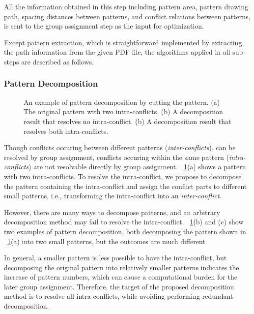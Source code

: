 All the information obtained in this step including pattern area,
pattern drawing path, spacing distances between patterns,
and conflict relations between patterns,
is sent to the group assignment step as the input for optimization.

Except pattern extraction,
which is straightforward implemented by extracting the path information from the given PDF file,
the algorithms applied in all sub-steps are described as follows.

\subsubsection{Pattern Decomposition}\label{sec:pd}

\begin{figure}[t]
	\fontsize{14}{14}  \selectfont
	\centerline{\resizebox{8.5cm}{!}{}}
	\caption{An example of pattern decomposition by cutting the pattern. (a) The original pattern with two intra-conflicts. (b) A decomposition result that resolves no intra-conflict. (b) A decomposition result that resolves both intra-conflicts.}
	\label{fig:selfcon}
	\normalsize
\end{figure}

Though conflicts occuring between different patterns (\textit{inter-conflicts}),
can be resolved by group assignment,
conflicts occuring within the same pattern (\textit{intra-conflicts})
are not resolvable directly by group assignment.
\figurename~\ref{fig:selfcon}(a) shows a pattern with two intra-conflicts.
To resolve the intra-conflict,
we propose to decompose the pattern containing the intra-conflict and assign the conflict parts to different small patterns,
i.e., transforming the intra-conflict into an \textit{inter-conflict}.

However, there are many ways to decompose patterns,
and an arbitrary decomposition method may fail to resolve the intra-conflict.
\figurename~\ref{fig:selfcon}(b) and (c) show two examples of pattern decomposition,
both decomposing the pattern shown in \figurename~\ref{fig:selfcon}(a) into two small patterns,
but the outcomes are much different.

In general, a smaller pattern is less possible to have the intra-conflict,
but decomposing the original pattern into relatively smaller patterns indicates the increase of pattern numbers,
which can cause a computational burden for the later group assignment.
Therefore,
the target of the proposed decomposition method is to resolve all intra-conflicts,
while avoiding performing redundant decomposition.

